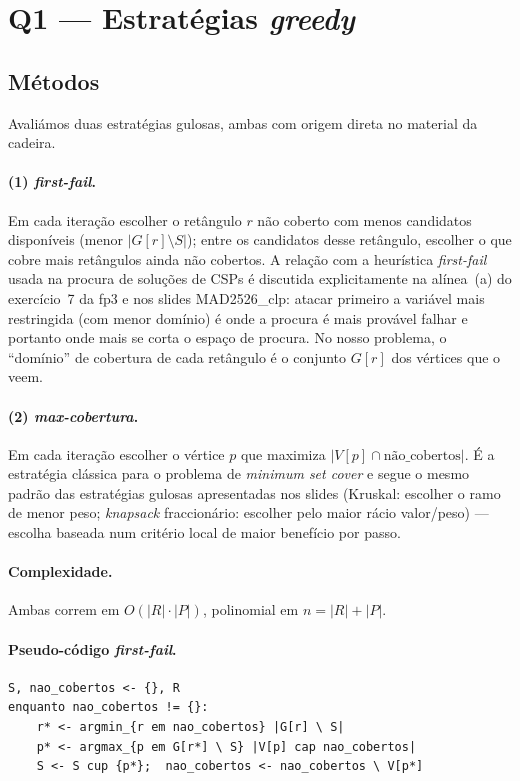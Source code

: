 \documentclass[11pt,a4paper]{article}
\begin{document}
\section{Q1 --- Estratégias \emph{greedy}}

\subsection{Métodos}

Avaliámos duas estratégias gulosas, ambas com origem direta no
material da cadeira.

\paragraph{(1) \emph{first-fail}.} Em cada iteração escolher o
retângulo $r$ não coberto com menos candidatos disponíveis (menor
$|G[r] \setminus S|$); entre os candidatos desse retângulo,
escolher o que cobre mais retângulos ainda não cobertos. A relação
com a heurística \emph{first-fail} usada na procura de soluções de
CSPs é discutida explicitamente na alínea~(a) do exercício~7
da fp3 e nos slides MAD2526\_clp: atacar primeiro a variável mais
restringida (com menor domínio) é onde a procura é mais provável
falhar e portanto onde mais se corta o espaço de procura. No nosso
problema, o ``domínio'' de cobertura de cada retângulo é o conjunto
$G[r]$ dos vértices que o veem.

\paragraph{(2) \emph{max-cobertura}.} Em cada iteração escolher o
vértice $p$ que maximiza $|V[p] \cap \text{não\_cobertos}|$. É a
estratégia clássica para o problema de \emph{minimum set cover} e
segue o mesmo padrão das estratégias gulosas apresentadas nos
slides (Kruskal: escolher o ramo de menor peso; \emph{knapsack}
fraccionário: escolher pelo maior rácio valor/peso) --- escolha
baseada num critério local de maior benefício por passo.

\paragraph{Complexidade.} Ambas correm em $O(|R|\cdot|P|)$, polinomial
em $n=|R|+|P|$.

\paragraph{Pseudo-código \emph{first-fail}.}
\begin{lstlisting}
S, nao_cobertos <- {}, R
enquanto nao_cobertos != {}:
    r* <- argmin_{r em nao_cobertos} |G[r] \ S|
    p* <- argmax_{p em G[r*] \ S} |V[p] cap nao_cobertos|
    S <- S cup {p*};  nao_cobertos <- nao_cobertos \ V[p*]
\end{lstlisting}
\end{document}
